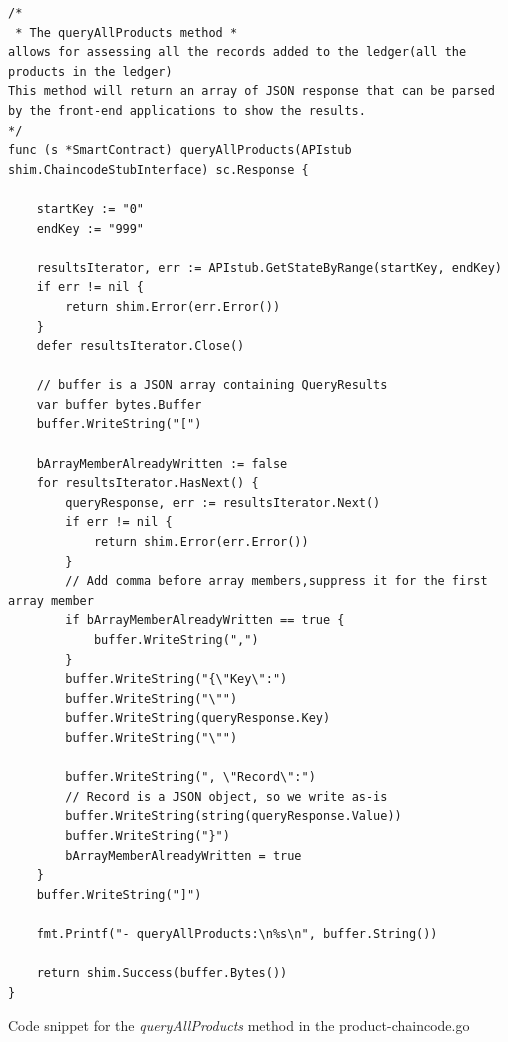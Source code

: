 \documentclass[
  a4paper,  %
  twoside,  %
  bibliography=totoc,
  headsepline,
  cleardoublepage=empty,
  parskip=half,
  draft=false
]{scrbook}
\begin{document}
\begin{Listing}[h!]
\begin{lstlisting}
/*
 * The queryAllProducts method *
allows for assessing all the records added to the ledger(all the products in the ledger)
This method will return an array of JSON response that can be parsed by the front-end applications to show the results.
*/
func (s *SmartContract) queryAllProducts(APIstub shim.ChaincodeStubInterface) sc.Response {

	startKey := "0"
	endKey := "999"

	resultsIterator, err := APIstub.GetStateByRange(startKey, endKey)
	if err != nil {
		return shim.Error(err.Error())
	}
	defer resultsIterator.Close()

	// buffer is a JSON array containing QueryResults
	var buffer bytes.Buffer
	buffer.WriteString("[")

	bArrayMemberAlreadyWritten := false
	for resultsIterator.HasNext() {
		queryResponse, err := resultsIterator.Next()
		if err != nil {
			return shim.Error(err.Error())
		}
		// Add comma before array members,suppress it for the first array member
		if bArrayMemberAlreadyWritten == true {
			buffer.WriteString(",")
		}
		buffer.WriteString("{\"Key\":")
		buffer.WriteString("\"")
		buffer.WriteString(queryResponse.Key)
		buffer.WriteString("\"")

		buffer.WriteString(", \"Record\":")
		// Record is a JSON object, so we write as-is
		buffer.WriteString(string(queryResponse.Value))
		buffer.WriteString("}")
		bArrayMemberAlreadyWritten = true
	}
	buffer.WriteString("]")

	fmt.Printf("- queryAllProducts:\n%s\n", buffer.String())

	return shim.Success(buffer.Bytes())
}
\end{lstlisting}
\caption{Code snippet for the \textit{queryAllProducts} method in the product-chaincode.go}
\label{lst:query}
\end{Listing}
\end{document}
